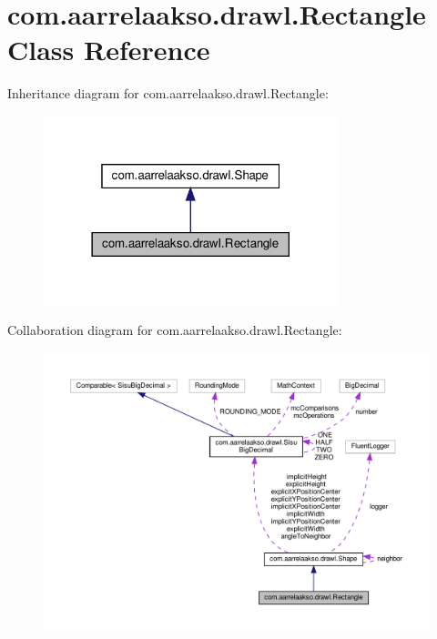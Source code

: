\hypertarget{classcom_1_1aarrelaakso_1_1drawl_1_1_rectangle}{}\section{com.\+aarrelaakso.\+drawl.\+Rectangle Class Reference}
\label{classcom_1_1aarrelaakso_1_1drawl_1_1_rectangle}


Inheritance diagram for com.\+aarrelaakso.\+drawl.\+Rectangle\+:\nopagebreak
\begin{figure}[H]
\begin{center}
\leavevmode
\includegraphics[width=242pt]{d9/d51/classcom_1_1aarrelaakso_1_1drawl_1_1_rectangle__inherit__graph}
\end{center}
\end{figure}


Collaboration diagram for com.\+aarrelaakso.\+drawl.\+Rectangle\+:\nopagebreak
\begin{figure}[H]
\begin{center}
\leavevmode
\includegraphics[width=350pt]{db/d7b/classcom_1_1aarrelaakso_1_1drawl_1_1_rectangle__coll__graph}
\end{center}
\end{figure}
